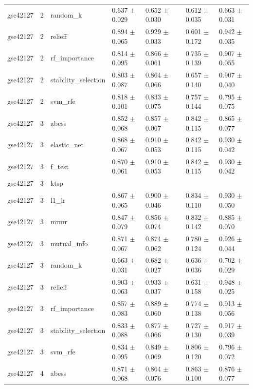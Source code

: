 \begin{table}[t]
\begin{tabular}{llllllll}
    gse42127 & 2 & random\_k & 0.637 $\pm$ 0.029 & 0.652 $\pm$ 0.030 &  & 0.612 $\pm$ 0.035 & 0.663 $\pm$ 0.031 \\
    gse42127 & 2 & relieff & 0.894 $\pm$ 0.065 & 0.929 $\pm$ 0.033 &  & 0.601 $\pm$ 0.172 & 0.942 $\pm$ 0.035 \\
    gse42127 & 2 & rf\_importance & 0.814 $\pm$ 0.095 & 0.866 $\pm$ 0.061 &  & 0.735 $\pm$ 0.139 & 0.907 $\pm$ 0.055 \\
    gse42127 & 2 & stability\_selection & 0.803 $\pm$ 0.087 & 0.864 $\pm$ 0.066 &  & 0.657 $\pm$ 0.140 & 0.907 $\pm$ 0.040 \\
    gse42127 & 2 & svm\_rfe & 0.818 $\pm$ 0.101 & 0.833 $\pm$ 0.075 &  & 0.757 $\pm$ 0.144 & 0.795 $\pm$ 0.075 \\
    gse42127 & 3 & abess & 0.852 $\pm$ 0.068 & 0.857 $\pm$ 0.067 &  & 0.842 $\pm$ 0.115 & 0.865 $\pm$ 0.077 \\
    gse42127 & 3 & elastic\_net & 0.868 $\pm$ 0.067 & 0.910 $\pm$ 0.053 &  & 0.842 $\pm$ 0.115 & 0.930 $\pm$ 0.042 \\
    gse42127 & 3 & f\_test & 0.870 $\pm$ 0.061 & 0.910 $\pm$ 0.053 &  & 0.842 $\pm$ 0.115 & 0.930 $\pm$ 0.042 \\
    gse42127 & 3 & ktsp &  &  &  &  &  \\
    gse42127 & 3 & l1\_lr & 0.867 $\pm$ 0.065 & 0.900 $\pm$ 0.046 &  & 0.834 $\pm$ 0.110 & 0.930 $\pm$ 0.050 \\
    gse42127 & 3 & mrmr & 0.847 $\pm$ 0.079 & 0.856 $\pm$ 0.074 &  & 0.832 $\pm$ 0.142 & 0.885 $\pm$ 0.070 \\
    gse42127 & 3 & mutual\_info & 0.871 $\pm$ 0.067 & 0.874 $\pm$ 0.062 &  & 0.780 $\pm$ 0.124 & 0.926 $\pm$ 0.044 \\
    gse42127 & 3 & random\_k & 0.663 $\pm$ 0.031 & 0.682 $\pm$ 0.027 &  & 0.636 $\pm$ 0.036 & 0.702 $\pm$ 0.029 \\
    gse42127 & 3 & relieff & 0.903 $\pm$ 0.063 & 0.933 $\pm$ 0.037 &  & 0.631 $\pm$ 0.158 & 0.948 $\pm$ 0.025 \\
    gse42127 & 3 & rf\_importance & 0.857 $\pm$ 0.083 & 0.889 $\pm$ 0.060 &  & 0.774 $\pm$ 0.138 & 0.913 $\pm$ 0.056 \\
    gse42127 & 3 & stability\_selection & 0.833 $\pm$ 0.088 & 0.877 $\pm$ 0.066 &  & 0.727 $\pm$ 0.130 & 0.917 $\pm$ 0.039 \\
    gse42127 & 3 & svm\_rfe & 0.834 $\pm$ 0.095 & 0.849 $\pm$ 0.069 &  & 0.806 $\pm$ 0.120 & 0.796 $\pm$ 0.072 \\
    gse42127 & 4 & abess & 0.871 $\pm$ 0.068 & 0.864 $\pm$ 0.076 &  & 0.863 $\pm$ 0.100 & 0.876 $\pm$ 0.077 \\

\end{tabular}
\end{table}
